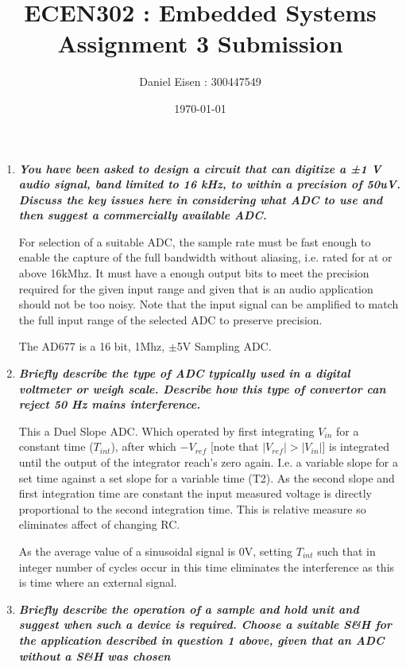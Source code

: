 \documentclass[11pt]{article}
\title{ECEN302 : Embedded Systems \\ Assignment 3 Submission}
\author{Daniel Eisen : 300447549}
\date{\today}
\begin{document}
    \maketitle
    \begin{enumerate}
        \item \textit{\textbf{You have been asked to design a circuit that can digitize a ±1 V audio signal, band limited to 16 kHz, to within a precision of 50uV. Discuss the key issues here in considering what ADC to use and then suggest a commercially available ADC.}}

              For selection of a suitable ADC, the sample rate must be fast enough to enable the capture of the full bandwidth without aliasing, i.e. rated for at or above 16kMhz. It must have a enough output bits to meet the precision required for the given input range and given that is an audio application should not be too noisy.
              Note that the input signal can be amplified to match the full input range of the selected ADC to preserve precision.

            The AD677 is a 16 bit, 1Mhz, $\pm$5V Sampling ADC.

        \item \textit{\textbf{Briefly describe the type of ADC typically used in a digital voltmeter or weigh scale. Describe how this type of convertor can reject 50 Hz mains interference.}}

              This a Duel Slope ADC. Which operated by first integrating $V_{in}$ for a constant time ($T_{int}$), after which $-V_{ref}$ [note that $|V_{ref}| > |V_{in}|$] is integrated until the output of the integrator reach's zero again. I.e. a variable slope for a set time against a set slope for a variable time (T2). As the second slope and first integration time are constant the input measured voltage is directly proportional to the second integration time. This is relative measure so eliminates affect of changing RC.

              As the average value of a sinusoidal signal is 0V, setting $T_{int}$ such that in integer number of cycles occur in this time eliminates the interference as this is time where an external signal.

        \item \textit{\textbf{Briefly describe the operation of a sample and hold unit and suggest when such a device is required. Choose a suitable S\&H for the application described in question 1 above, given that an ADC without a S\&H was chosen}}


\end{enumerate}
\end{document}

